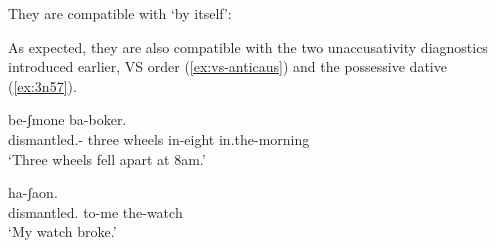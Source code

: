 \begin{exe}
\begin{xlist}
\begin{xlist}
\begin{exe}
\begin{xlist}
\begin{xlist}
\begin{exe}
\begin{xlist}
\begin{xlist}
\begin{exe}
\begin{exe}
\begin{xlist}
\begin{exe}
\begin{exe}
\begin{xlist}
\begin{exe}
\begin{exe}
\begin{exe}
\begin{exe}
\begin{exe}
\begin{xlist}
\begin{exe}
\begin{xlist}
\begin{exe}
\begin{exe}
\begin{xlist}
\begin{exe}
\begin{xlist}
\begin{exe}
\begin{xlist}
\begin{exe}
\begin{exe}
\begin{exe}
\begin{xlist}
\begin{exe}
\begin{exe}
\begin{exe}
\begin{xlist}
\begin{exe}
\begin{xlist}
\begin{exe}
\begin{exe}
\begin{xlist}
\begin{exe}
\begin{exe}
\begin{exe}
\begin{exe}
\begin{xlist}
\begin{exe}
\begin{xlist}
\begin{exe}
\begin{xlist}
\begin{exe}
\begin{xlist}
\begin{exe}
\begin{xlist}
\begin{exe}
\begin{xlist}
\begin{exe}
\begin{exe}
\begin{xlist}
\begin{exe}
\begin{xlist}
\begin{exe}
\begin{exe}
\begin{xlist}
\begin{exe}
\begin{xlist}
\begin{exe}
 \z 
They are compatible with `by itself':
 \begin{exe}
	
 \z 

As expected, they are also compatible with the two unaccusativity diagnostics introduced earlier, VS order (\ref{ex:vs-anticaus}) and the possessive dative (\ref{ex:3n57}).
 \begin{exe}
\ex \label{ex:vs-anticaus}  
 { \gll {}   be-ʃmone ba-boker.\\
 	  dismantled.- three wheels in-eight in.the-morning\\
 	\glt `Three wheels fell apart at 8am.' } 
	
 \ex  \label{ex:3n57}
 { \gll {}  ha-ʃaon.\\
   dismantled. to-me the-watch\\
 \glt `My watch broke.' } 

 \z 


\end{exe}
\end{exe}
\end{exe}
\end{xlist}
\end{exe}
\end{xlist}
\end{exe}
\end{exe}
\end{xlist}
\end{exe}
\end{xlist}
\end{exe}
\end{exe}
\end{xlist}
\end{exe}
\end{xlist}
\end{exe}
\end{xlist}
\end{exe}
\end{xlist}
\end{exe}
\end{xlist}
\end{exe}
\end{xlist}
\end{exe}
\end{exe}
\end{exe}
\end{exe}
\end{xlist}
\end{exe}
\end{exe}
\end{xlist}
\end{exe}
\end{xlist}
\end{exe}
\end{exe}
\end{exe}
\end{xlist}
\end{exe}
\end{exe}
\end{exe}
\end{xlist}
\end{exe}
\end{xlist}
\end{exe}
\end{xlist}
\end{exe}
\end{exe}
\end{xlist}
\end{exe}
\end{xlist}
\end{exe}
\end{exe}
\end{exe}
\end{exe}
\end{exe}
\end{xlist}
\end{exe}
\end{exe}
\end{xlist}
\end{exe}
\end{exe}
\end{xlist}
\end{xlist}
\end{exe}
\end{xlist}
\end{xlist}
\end{exe}
\end{xlist}
\end{xlist}
\end{exe}
